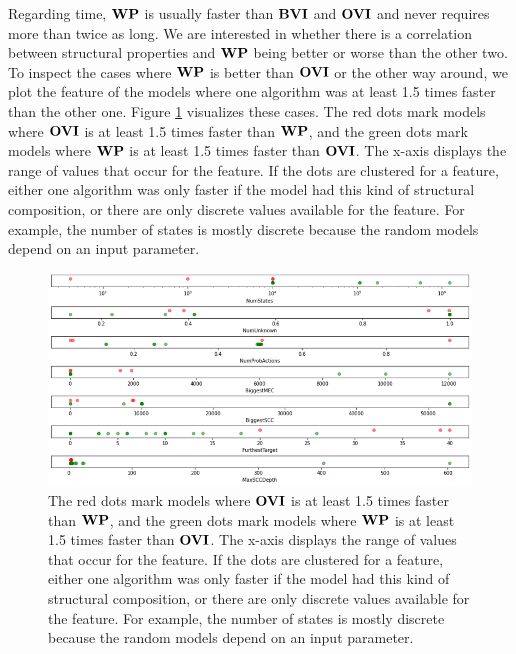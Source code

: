 \iffalse
Regarding time, $\WP$ is usually faster than $\mathbf{BVI}$ and $\OVI$ and never requires more than twice as long.
We are interested in whether there is a correlation between structural properties and $\WP$ being better or worse than the other two.
To inspect the cases where $\WP$ is better than $\OVI$ or the other way around, we plot the feature of the models where one algorithm was at least
1.5 times faster than the other one. Figure \ref{fig:WPvsOVIon1DFeatureScatter} visualizes these cases. 
The red dots mark models where $\OVI$ is at least 1.5 times faster than $\WP$, and the green dots mark models where $\WP$ is at least 1.5 times faster than $\OVI$.
The x-axis displays the range of values that occur for the feature. 
If the dots are clustered for a feature, either one algorithm was only faster if the model had this kind of structural composition, 
or there are only discrete values available for the feature. For example, the number of states is mostly discrete because the random models depend on an input parameter.

\begin{figure}[t]
    \centering
    \includegraphics[width=1\textwidth]{figures/WPvsOVIon1DFeatureScatter.png}
    \caption[$\WP$ compared to $\OVI$]{
        The red dots mark models where $\OVI$ is at least 1.5 times faster than $\WP$, and the green dots mark models where $\WP$ is at least 1.5 times faster than $\OVI$.
        The x-axis displays the range of values that occur for the feature. 
        If the dots are clustered for a feature, either one algorithm was only faster if the model had this kind of structural composition, 
        or there are only discrete values available for the feature. For example, the number of states is mostly discrete because the random models depend on an input parameter.
    }
    \label{fig:WPvsOVIon1DFeatureScatter}
\end{figure}

